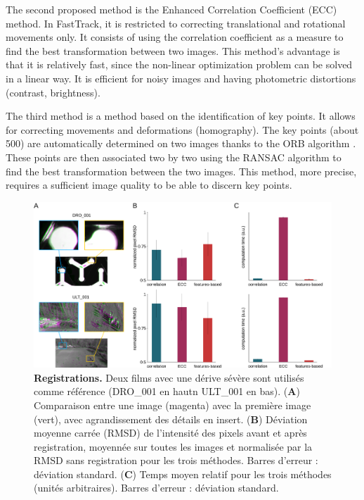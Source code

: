 		The second proposed method is the Enhanced Correlation Coefficient (ECC) method. In FastTrack, it is restricted to correcting translational and rotational movements only. It consists of using the correlation coefficient as a measure to find the best transformation between two images. This method's advantage is that it is relatively fast, since the non-linear optimization problem can be solved in a linear way. It is efficient for noisy images and having photometric distortions (contrast, brightness).


		The third method is a method based on the identification of key points. It allows for correcting movements and deformations (homography). The key points (about 500) are automatically determined on two images thanks to the ORB algorithm \cite{}. These points are then associated two by two using the RANSAC algorithm \cite{} to find the best transformation between the two images. This method, more precise, requires a sufficient image quality to be able to discern key points.
		
	\begin{figure}[h]
    \centering
    \includegraphics[width=1\textwidth]{part_1/assets/Figure_2.png}    
    \caption{\textbf{Registrations.} Deux films avec une dérive sévère sont utilisés comme référence (DRO\_001 en hautn ULT\_001 en bas). (\textbf{A}) Comparaison entre une image (magenta) avec la première image (vert), avec agrandissement des détails en insert. (\textbf{B}) Déviation moyenne carrée (RMSD) de l'intensité des pixels avant et après registration, moyennée sur toutes les images et normalisée par la RMSD sans registration pour les trois méthodes. Barres d'erreur : déviation standard. (\textbf{C}) Temps moyen relatif pour les trois méthodes (unités arbitraires). Barres d'erreur : déviation standard.}
    \label{part_1:fig_2}
    \end{figure}
		
